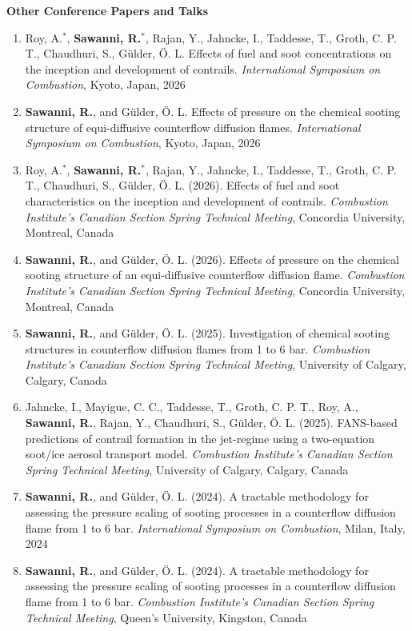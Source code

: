 \documentclass[11pt,a4paper]{article}
\begin{document}
	\vspace*{6pt}
	\noindent\textbf{Other Conference Papers and Talks}
	\begin{enumerate}
		\item {Roy, A.$^*$, \textbf{Sawanni, R.}$^*$, Rajan, Y., Jahncke, I., Taddesse, T., Groth, C. P. T., Chaudhuri, S., G\"{u}lder, \"{O}. L. Effects of fuel and soot concentrations on the inception and development of contrails. \emph{International Symposium on Combustion}, Kyoto, Japan, 2026}
		\item {\textbf{Sawanni, R.}, and G\"{u}lder, \"{O}. L. Effects of pressure on the chemical sooting structure of equi-diffusive counterflow diffusion flames. \emph{International Symposium on Combustion}, Kyoto, Japan, 2026}
		\item {Roy, A.$^*$, \textbf{Sawanni, R.}$^*$, Rajan, Y., Jahncke, I., Taddesse, T., Groth, C. P. T., Chaudhuri, S., G\"{u}lder, \"{O}. L. (2026). Effects of fuel and soot characteristics on the inception and development of contrails. \emph{Combustion Institute's Canadian Section Spring Technical Meeting}, Concordia University, Montreal, Canada}
		\item {\textbf{Sawanni, R.}, and G\"{u}lder, \"{O}. L. (2026). Effects of pressure on the chemical sooting structure of an equi-diffusive counterflow diffusion flame. \emph{Combustion Institute's Canadian Section Spring Technical Meeting}, Concordia University, Montreal, Canada}
		\item {\textbf{Sawanni, R.}, and G\"{u}lder, \"{O}. L. (2025). Investigation of chemical sooting structures in counterflow diffusion flames from 1 to 6 bar. \emph{Combustion Institute's Canadian Section Spring Technical Meeting}, University of Calgary, Calgary, Canada}
		\item Jahncke, I., Mayigue, C. C., Taddesse, T., Groth, C. P. T., Roy, A., \textbf{Sawanni, R.}, Rajan, Y., Chaudhuri, S., G\"{u}lder, \"{O}. L. (2025). FANS-based predictions of contrail formation in the jet-regime  using a two-equation soot/ice aerosol transport model. \emph{Combustion Institute's Canadian Section Spring Technical Meeting}, University of Calgary, Calgary, Canada
		\item {\textbf{Sawanni, R.}, and G\"{u}lder, \"{O}. L. (2024). A tractable methodology for assessing the pressure scaling of sooting processes in a counterflow diffusion flame from 1 to 6 bar. \emph{International Symposium on Combustion}, Milan, Italy, 2024}
		\item {\textbf{Sawanni, R.}, and G\"{u}lder, \"{O}. L. (2024). A tractable methodology for assessing the pressure scaling of sooting processes in a counterflow diffusion flame from 1 to 6 bar. \emph{Combustion Institute's Canadian Section Spring Technical Meeting}, Queen's University, Kingston, Canada}

\end{enumerate}
\end{document}
